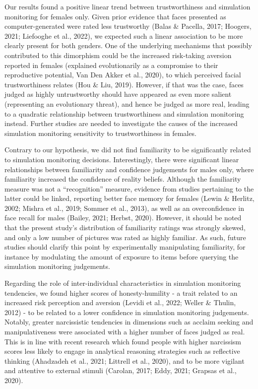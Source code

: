 \documentclass[
  man,floatsintext]{apa6}
\begin{document}
Our results found a positive linear trend between trustworthiness and simulation monitoring for females only. Given prior evidence that faces presented as computer-generated were rated less trustworthy (Balas \& Pacella, 2017; Hoogers, 2021; Liefooghe et al., 2022), we expected such a linear association to be more clearly present for both genders. One of the underlying mechanisms that possibly contributed to this dimorphism could be the increased risk-taking aversion reported in females
(explained evolutionarily as a compromise to their reproductive potential, Van Den Akker et al., 2020),
to which perceived facial trustworthiness relates (Hou \& Liu, 2019). However, if that was the case, faces judged as highly untrustworthy should have appeared as even more salient (representing an evolutionary threat), and hence be judged as more real, leading to a quadratic relationship between trustworthiness and simulation monitoring instead. Further studies are needed to investigate the causes of the increased simulation monitoring sensitivity to trustworthiness in females.

Contrary to our hypothesis, we did not find familiarity to be significantly related to simulation monitoring decisions. Interestingly, there were significant linear relationships between familiarity and confidence judgements for males only, where familiarity increased the confidence of reality beliefs. Although the familiarity measure was not a ``recognition'' measure, evidence from studies pertaining to the latter could be linked, reporting better face memory for females (Lewin \& Herlitz, 2002; Mishra et al., 2019; Sommer et al., 2013), as well as an overconfidence in face recall for males (Bailey, 2021; Herbst, 2020). However, it should be noted that the present study's distribution of familiarity ratings was strongly skewed, and only a low number of pictures was rated as highly familiar. As such, future studies should clarify this point by experimentally manipulating familiarity, for instance by modulating the amount of exposure to items before querying the simulation monitoring judgements.

Regarding the role of inter-individual characteristics in simulation monitoring tendencies, we found higher scores of honesty-humility - a trait related to an increased risk perception and aversion (Levidi et al., 2022; Weller \& Thulin, 2012) - to be related to a lower confidence in simulation monitoring judgements. Notably, greater narcissistic tendencies in dimensions such as acclaim seeking and manipulativeness were associated with a higher number of faces judged as real. This is in line with recent research which found people with higher narcissism scores less likely to engage in analytical reasoning strategies such as reflective thinking (Ahadzadeh et al., 2021; Littrell et al., 2020), and to be more vigilant and attentive to external stimuli (Carolan, 2017; Eddy, 2021; Grapsas et al., 2020).
\end{document}
